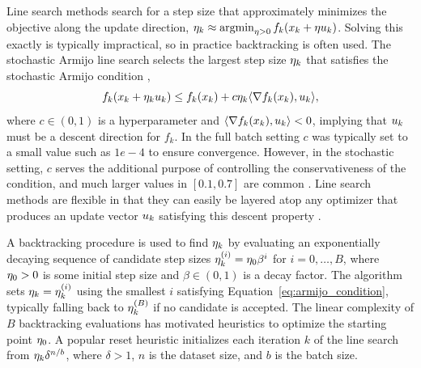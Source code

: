   Line search methods search for a step size that approximately minimizes the objective along the update direction, $\eta_{k} \approx \operatorname{argmin}_{\eta > 0} f_k(x_{k} + \eta u_{k})$. Solving this exactly is typically impractical, so in practice backtracking is often used. The stochastic Armijo line search selects the largest step size $\eta_{k}$ that satisfies the stochastic Armijo condition \cite{vaswani2019painless},
  \begin{equation}
          f_k(x_{k} + \eta_{k} u_{k}) \le f_k(x_{k}) + c \eta_{k} \langle \nabla f_k(x_{k}), u_{k} \rangle,
      \label{eq:armijo_condition}
  \end{equation}
  where $c \in (0, 1)$ is a hyperparameter and $\langle \nabla f_k(x_{k}), u_{k} \rangle < 0$, implying that $u_{k}$ must be a descent direction for $f_k$. In the full batch setting $c$ was typically set to a small value such as $1e-4$ to ensure convergence. However, in the stochastic setting, $c$ serves the additional purpose of controlling the conservativeness of the condition, and much larger values in $[0.1, 0.7]$ are common . Line search methods are flexible in that they can easily be layered atop any optimizer that produces an update vector $u_{k}$ satisfying this descent property \cite{nocedal2006numerical,vaswani2025armijo,shea2024so}.
  
  A backtracking procedure is used to find $\eta_{k}$ by evaluating an exponentially decaying sequence of candidate step sizes $\eta_{k}^{(i)} = \eta_0 \beta^i$ for $i = 0, \dots, B$, where $\eta_0 > 0$ is some initial step size and $\beta \in (0, 1)$ is a decay factor. The algorithm sets $\eta_{k} = \eta_{k}^{(i)}$ using the smallest $i$ satisfying Equation~\eqref{eq:armijo_condition}, typically falling back to $\eta_{k}^{(B)}$ if no candidate is accepted. The linear complexity of $B$ backtracking evaluations has motivated heuristics to optimize the starting point $\eta_0$. A popular reset heuristic \cite{vaswani2019painless} initializes each iteration $k$ of the line search from $\eta_{k} \delta^{n/b}$, where $\delta > 1$, $n$ is the dataset size, and $b$ is the batch size.
  

